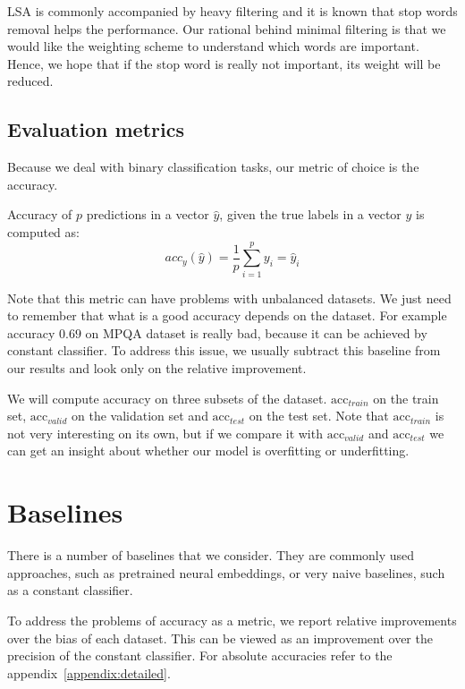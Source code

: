     LSA is commonly accompanied by heavy filtering and it is known that stop words removal helps the performance.
    Our rational behind minimal filtering is that we would like the weighting scheme to understand which words are important.
    Hence, we hope that if the stop word is really not important, its weight will be reduced.
    
    \subsection{Evaluation metrics}
    
    Because we deal with binary classification tasks, our metric of choice is the accuracy.
    
    Accuracy of $p$ predictions in a vector $\hat{y}$, given the true labels in a vector $y$ is computed as:
    $$acc_y(\hat{y}) = \frac{1}{p}\sum_{i=1}^py_i =\hat{y}_i$$
    
    Note that this metric can have problems with unbalanced datasets. 
    We just need to remember that what is a good accuracy depends on the dataset.
    For example accuracy $0.69$ on MPQA dataset is really bad, because it can be achieved by constant classifier.
    To address this issue, we usually subtract this baseline from our results and look only on the relative improvement. 
    
    We will compute accuracy on three subsets of the dataset. 
    $\mathrm{acc}_{train}$ on the train set, $\mathrm{acc}_{valid}$ on the validation set and $\mathrm{acc}_{test}$ on the test set.
    Note that $\mathrm{acc}_{train}$ is not very interesting on its own, but if we compare it with $\mathrm{acc}_{valid}$ and $\mathrm{acc}_{test}$ we can get an insight about whether our model is overfitting or underfitting.


\section{Baselines} \label{sec:baseline}

    There is a number of baselines that we consider.
    They are commonly used approaches, such as pretrained neural embeddings, or very naive baselines, such as a constant classifier.
    
    To  address the problems of accuracy as a metric, we report relative improvements over the bias of each dataset.
    This can be viewed as an improvement over the precision of the constant classifier.
    For absolute accuracies refer to the appendix~\ref{appendix:detailed}. 

